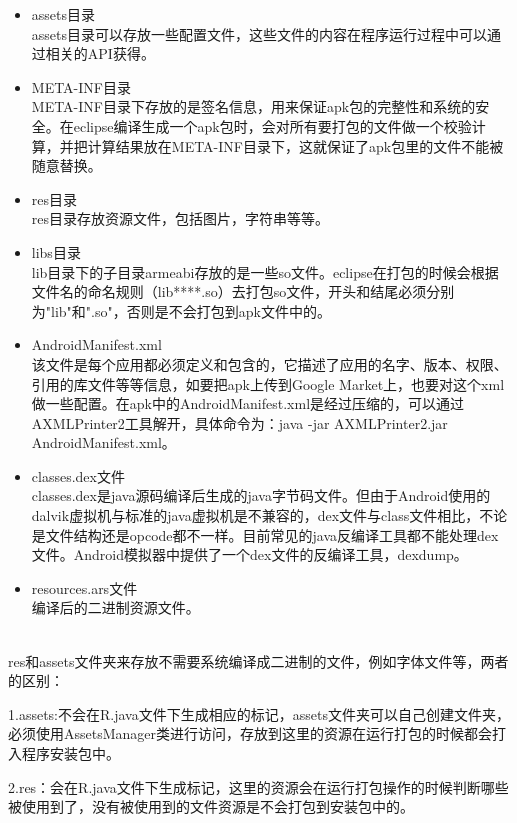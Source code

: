 \begin{itemize}
\item assets目录\\
assets目录可以存放一些配置文件，这些文件的内容在程序运行过程中可以通过相关的API获得。

\item META-INF目录\\
META-INF目录下存放的是签名信息，用来保证apk包的完整性和系统的安全。在eclipse编译生成一个apk包时，会对所有要打包的文件做一个校验计算，并把计算结果放在META-INF目录下，这就保证了apk包里的文件不能被随意替换。

\item res目录\\
res目录存放资源文件，包括图片，字符串等等。

\item libs目录\\
lib目录下的子目录armeabi存放的是一些so文件。eclipse在打包的时候会根据文件名的命名规则（lib****.so）去打包so文件，开头和结尾必须分别为"lib"和".so"，否则是不会打包到apk文件中的。

\item AndroidManifest.xml\\
该文件是每个应用都必须定义和包含的，它描述了应用的名字、版本、权限、引用的库文件等等信息，如要把apk上传到Google Market上，也要对这个xml做一些配置。在apk中的AndroidManifest.xml是经过压缩的，可以通过AXMLPrinter2工具解开，具体命令为：java -jar AXMLPrinter2.jar AndroidManifest.xml。

\item classes.dex文件\\
 classes.dex是java源码编译后生成的java字节码文件。但由于Android使用的dalvik虚拟机与标准的java虚拟机是不兼容的，dex文件与class文件相比，不论是文件结构还是opcode都不一样。目前常见的java反编译工具都不能处理dex文件。Android模拟器中提供了一个dex文件的反编译工具，dexdump。

\item resources.ars文件\\
编译后的二进制资源文件。
\end{itemize}

\\
res和assets文件夹来存放不需要系统编译成二进制的文件，例如字体文件等，两者的区别：

1.assets:不会在R.java文件下生成相应的标记，assets文件夹可以自己创建文件夹，必须使用AssetsManager类进行访问，存放到这里的资源在运行打包的时候都会打入程序安装包中。

2.res：会在R.java文件下生成标记，这里的资源会在运行打包操作的时候判断哪些被使用到了，没有被使用到的文件资源是不会打包到安装包中的。

